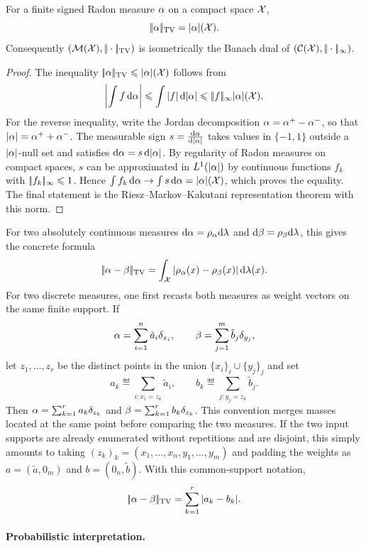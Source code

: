 \begin{prop}\label{prop-tv-dual-measure}
	For a finite signed Radon measure $\alpha$ on a compact space $\mathcal{X}$,
	\[
		|\!| \alpha |\!|_{\operatorname{TV}}=|\alpha|(\mathcal{X}).
	\]
	Consequently $(\mathcal{M}(\mathcal{X}),|\!| \cdot |\!|_{\operatorname{TV}})$ is isometrically the Banach dual of $(\mathcal{C}(\mathcal{X}),|\!| \cdot |\!|_\infty)$.
\end{prop}
\begin{proof}
	The inequality $|\!| \alpha |\!|_{\operatorname{TV}}\leqslant |\alpha|(\mathcal{X})$ follows from
	\[
		\left\lvert\int f\,\mathrm{d}\alpha\right\rvert\leqslant \int |f|\,\mathrm{d}|\alpha|\leqslant |\!| f |\!|_\infty |\alpha|(\mathcal{X}).
	\]
	For the reverse inequality, write the Jordan decomposition $\alpha=\alpha^+-\alpha^-$, so that $|\alpha|=\alpha^++\alpha^-$. The measurable sign $s=\frac{\mathrm{d}\alpha}{\mathrm{d}|\alpha|}$ takes values in $\{-1,1\}$ outside a $|\alpha|$-null set and satisfies $\mathrm{d}\alpha=s\,\mathrm{d}|\alpha|$. By regularity of Radon measures on compact spaces, $s$ can be approximated in $L^1(|\alpha|)$ by continuous functions $f_k$ with $|\!| f_k |\!|_\infty\leqslant1$. Hence $\int f_k\,\mathrm{d}\alpha\to\int s\,\mathrm{d}\alpha=|\alpha|(\mathcal{X})$, which proves the equality. The final statement is the Riesz--Markov--Kakutani representation theorem with this norm.
\end{proof}

For two absolutely continuous measures $\mathrm{d}\alpha=\rho_\alpha\mathrm{d}\lambda$ and $\mathrm{d}\beta=\rho_\beta\mathrm{d}\lambda$, this gives the concrete formula
\[
	|\!| \alpha-\beta |\!|_{\operatorname{TV}}
	=
	\int_{\mathcal{X}} |\rho_\alpha(x)-\rho_\beta(x)|\,\mathrm{d}\lambda(x).
\]
For two discrete measures, one first recasts both measures as weight vectors on
the same finite support. If
\[
	\alpha=\sum_{i=1}^n \tilde a_i\delta_{x_i},
	\qquad
	\beta=\sum_{j=1}^m \tilde b_j\delta_{y_j},
\]
let $z_1,\ldots,z_r$ be the distinct points in the union
$\{x_i\}_i\cup\{y_j\}_j$ and set
\[
	a_k\eqdef\sum_{i:x_i=z_k}\tilde a_i,
	\qquad
	b_k\eqdef\sum_{j:y_j=z_k}\tilde b_j.
\]
Then $\alpha=\sum_{k=1}^r a_k\delta_{z_k}$ and
$\beta=\sum_{k=1}^r b_k\delta_{z_k}$.
This convention merges masses located at the same point before comparing the two
measures. If the two input supports are already enumerated without repetitions
and are disjoint, this simply amounts to taking
$(z_k)_k=(x_1,\ldots,x_n,y_1,\ldots,y_m)$ and padding the weights as
$a=(\tilde a,0_m)$ and $b=(0_n,\tilde b)$. With this common-support notation,
\[
	|\!| \alpha-\beta |\!|_{\operatorname{TV}}
	=
	\sum_{k=1}^r |a_k-b_k|.
\]
\paragraph{Probabilistic interpretation.}

